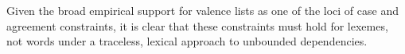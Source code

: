 \documentclass[output=paper
,notxmath 
 	        ,biblatex
                ,babelshorthands
                ,newtxmath
                ,draftmode
                ,colorlinks, citecolor=brown
]{langscibook}
\begin{document}
Given the broad empirical support for valence lists as one of the loci
of case and agreement constraints, it is clear that these constraints
must hold for lexemes, not words under a traceless, lexical
approach to unbounded dependencies.














\end{document}
